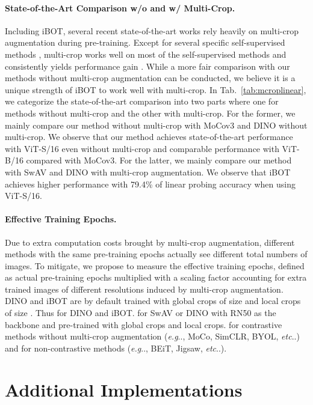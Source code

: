 \documentclass{article} \usepackage{iclr2022_conference,times}
\makeatletter
\def\vs{{\bm{s}}}
\def\ourmethod{{iBOT}\xspace}
\DeclareRobustCommand\onedot{\futurelet\@let@token\@onedot}
\def\@onedot{\ifx\@let@token.\else.\null\fi\xspace}
\def\eg{\emph{e.g}\onedot} \def\Eg{\emph{E.g}\onedot}
\def\etc{\emph{etc}\onedot} \def\vs{\emph{vs}\onedot}
\makeatother
\begin{document}
\paragraph{State-of-the-Art Comparison w/o and w/ Multi-Crop.} Including \ourmethod, several recent state-of-the-art works \citep{dino,swav} rely heavily on multi-crop augmentation during pre-training. Except for several specific self-supervised methods \citep{byol}, multi-crop works well on most of the self-supervised methods and consistently yields performance gain \citep{dino}. While a more fair comparison with our methods without multi-crop augmentation can be conducted, we believe it is a unique strength of \ourmethod to work well with multi-crop. In Tab.~\ref{tab:mcroplinear}, we categorize the state-of-the-art comparison into two parts where one for methods without multi-crop and the other with multi-crop. For the former, we mainly compare our method without multi-crop with MoCov3 \citep{mocov3} and DINO without multi-crop. We observe that our method achieves state-of-the-art performance with ViT-S/16 even without multi-crop and comparable performance with ViT-B/16 compared with MoCov3. For the latter, we mainly compare our method with SwAV \citep{swav} and DINO with multi-crop augmentation. We observe that \ourmethod achieves higher performance with 79.4\% of linear probing accuracy when using ViT-S/16.

\paragraph{Effective Training Epochs.}
Due to extra computation costs brought by multi-crop augmentation, different methods with the same pre-training epochs actually see different total numbers of images. To mitigate, we propose to measure the effective training epochs, defined as actual pre-training epochs multiplied with a scaling factor accounting for extra trained images of different resolutions induced by multi-crop augmentation. DINO and \ourmethod are by default trained with  global crops of size  and  local crops of size . Thus  for DINO and \ourmethod.  for SwAV or DINO with RN50 as the backbone and pre-trained with  global crops and  local crops.  for contrastive methods without multi-crop augmentation (\eg, MoCo, SimCLR, BYOL, \etc) and  for non-contrastive methods (\eg, BEiT, Jigsaw, \etc).

\section{Additional Implementations}
\label{sec:addimplement}
\end{document}
